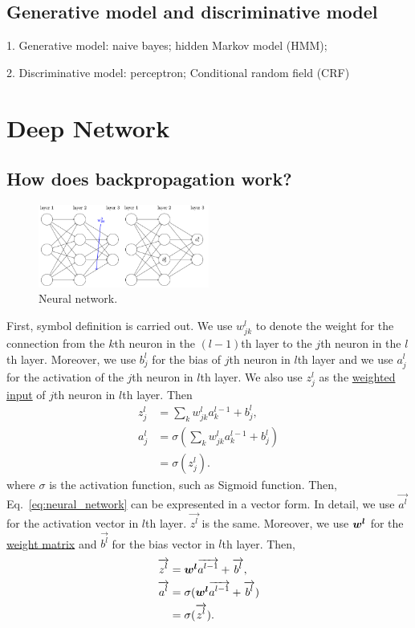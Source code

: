 \documentclass[10pt,onecolumn]{book}
\newcommand{\bm}[1]{\mbox{\boldmath{$#1$}}}
\begin{document}

\section{Generative model and discriminative model}

1. Generative model: naive bayes; hidden Markov model (HMM);

2. Discriminative model: perceptron; Conditional random field (CRF)


\chapter{Deep Network}
\section{How does backpropagation work?}
\begin{figure}[h]
\centering
\includegraphics[width=0.5\textwidth]{figures/neural_network.png}
\caption{Neural network.}
\end{figure}
First, symbol definition is carried out. We use $w^l_{jk}$ to denote the weight for the connection from the $k$th neuron in the $(l - 1)$th layer to the $j$th neuron in the $l$th layer. Moreover, we use $b^l_j$ for the bias of $j$th neuron in $l$th layer and we use $a^l_j$ for the activation of the $j$th neuron in $l$th layer. We also use $z^l_j$ as the \uline{weighted input}  of $j$th neuron in $l$th layer. Then
\begin{equation}
\begin{split}
z^l_j & = \sum_k w^l_{jk} a^{l - 1} _ k + b^l_j, \\
a^l_j & = \sigma(\sum_k w^l_{jk} a^{l - 1} _ k + b^l_j) \\
	  & = \sigma(z^l_j).
\end{split}
\label{eq:neural_network}
\end{equation}
where $\sigma$ is the activation function, such as Sigmoid function. Then, Eq.~\ref{eq:neural_network} can be expresented in a vector form. In detail, we use $\vec{a^l}$ for the activation vector in $l$th layer. $\vec{z^l}$ is the same. Moreover, we use $\bm{w^l}$ for the \uline{weight matrix} and $\vec{b^l}$ for the bias vector in $l$th layer. Then, 
\begin{equation}
\begin{split}
\overrightarrow{z^l} & = \bm{w^l}\overrightarrow{a^{l - 1}} + \overrightarrow{b^l}, \\
\overrightarrow{a^l} & = \sigma(\bm{w^l}\overrightarrow{a^{l - 1}} + \overrightarrow{b^l}) \\
		  & = \sigma(\overrightarrow{z^l}).
\end{split}
\end{equation}
\end{document}

